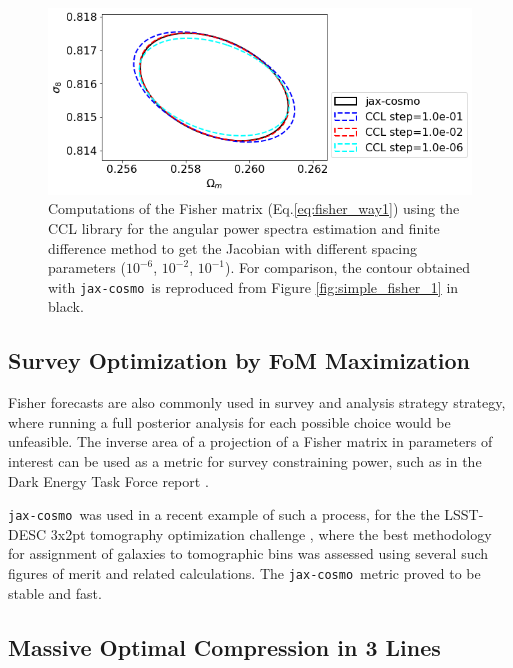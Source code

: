 \documentclass[twocolumn,twocolappendix,nofootinbib,iop]{openjournal}
\newcommand{\jaxcosmo}{\texttt{jax-cosmo}}
\begin{document}
\begin{figure}
    \centering
    \includegraphics[width=\columnwidth]{figures/simple_fisher_2.png}
    \caption{Computations of the Fisher matrix (Eq.\ref{eq:fisher_way1}) using the CCL library for the angular power spectra estimation and finite difference method to get the Jacobian  with different spacing parameters ($10^{-6}$, $10^{-2}$, $10^{-1}$). For comparison, the contour obtained with \jaxcosmo\ is reproduced from Figure \ref{fig:simple_fisher_1} in black.} 
    \label{fig:simple_fisher_2}
\end{figure}
%
\subsection{Survey Optimization by FoM Maximization}
\label{sec-FOM-optimisation}

Fisher forecasts are also commonly used in survey and analysis strategy strategy, where running a full posterior analysis for each possible choice would be unfeasible. The inverse area of a projection of a Fisher matrix in parameters of interest can be used as a metric for survey constraining power, such as in the Dark Energy Task Force report \citep{2006astro.ph..9591A}.

\jaxcosmo\ was used in a recent example of such a process, for the  the LSST-DESC 3x2pt tomography optimization challenge \citep{2021OJAp....4E..13Z}, where the best methodology for assignment of galaxies to tomographic bins was assessed using several such figures of merit and related calculations. The \jaxcosmo\ metric proved to be stable and fast.



\subsection{Massive Optimal Compression in 3 Lines}
\end{document}
